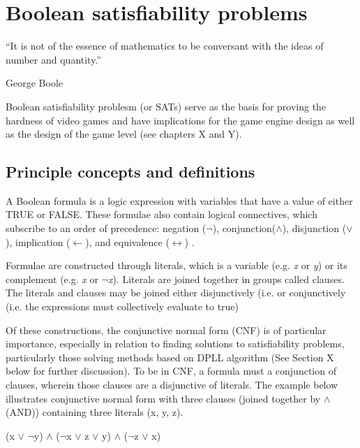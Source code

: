 \documentclass[11pt, a4paper, oneside]{report} %
\begin{document}
\chapter{Boolean satisfiability problems}

\epigraph{``It is not of the essence of mathematics to be conversant with the
ideas of number and quantity.''}{George Boole}

Boolean satisfiability problesm (or SATs) serve as the basis for proving the
hardness of video games and have implications for the game engine design as well
as the design of the  game level (see chapters X and Y). 


\section{Principle concepts and definitions}

A Boolean formula is a logic expression with variables that have a value of
either TRUE or FALSE. These formulae also contain logical connectives, which
subscribe to an order of precedence: negation ($\neg$), conjunction($\wedge$),
disjunction ($\vee$), implication ($\leftarrow$), and equivalence
($\leftrightarrow$) \cite{balyo2010solving,gomes2008satisfiability}.

Formulae are constructed through literals, which is a variable (e.g. \textit{x}
or \textit{y}) or its complement (e.g. \textit{x} or $\neg$\textit{x}). Literals
are joined together in groups called clauses. The literals and clauses may be
joined either disjunctively (i.e. or conjunctively (i.e. the expressions must
collectively evaluate to true)

Of these constructions, the conjunctive normal form (CNF) is of particular
importance, especially in relation to finding solutions to satisfiability
problems, particularly those solving methods based on DPLL algorithm
\cite{gomes2008satisfiability} (See Section X below for further discussion). To
be in CNF, a formula must a conjunction of clauses, wherein those clauses are a
disjunctive of literals. The example below illustrates conjunctive normal form
with three clauses (joined together by $\wedge$ (AND)) containing three literals
(x, y, z).

\centerline{(x $\vee$ $\neg$y) $\wedge$ ($\neg$x $\vee$ z $\vee$ y) $\wedge$ ($\neg$z $\vee$ x)}
\end{document}
